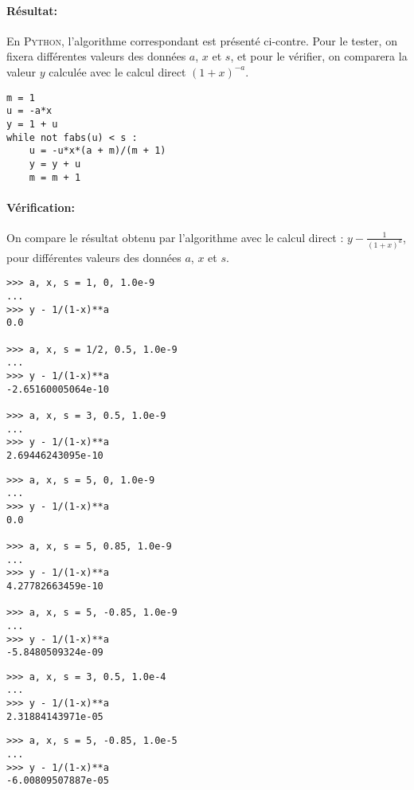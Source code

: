\documentclass[11pt,a4paper,colorlinks,breaklinks]{article}
\def\python{\textsc{Python}}
\begin{document}
\paragraph{Résultat:} En \python, l'algorithme correspondant est présenté
ci-contre.
Pour le tester, on fixera différentes valeurs des données $a$, $x$ et $s$,
et pour le vérifier, on comparera la valeur $y$ calculée 
avec le calcul direct $(1+x)^{-a}$.

\begin{minipage}[t]{8cm}
\begin{lstlisting}
m = 1
u = -a*x
y = 1 + u
while not fabs(u) < s :
    u = -u*x*(a + m)/(m + 1)
    y = y + u
    m = m + 1
\end{lstlisting}
\end{minipage}

\paragraph{Vérification:}
On compare le résultat obtenu par l'algorithme avec 
le calcul direct : $\displaystyle y - \frac{1}{(1+x)^a}$, 
pour différentes valeurs des données $a$, $x$ et $s$.
\vspace*{3mm}

\noindent
\begin{minipage}[t]{7cm}\footnotesize
\begin{Verbatim}
>>> a, x, s = 1, 0, 1.0e-9
...
>>> y - 1/(1-x)**a
0.0

>>> a, x, s = 1/2, 0.5, 1.0e-9
...
>>> y - 1/(1-x)**a
-2.65160005064e-10

>>> a, x, s = 3, 0.5, 1.0e-9
...
>>> y - 1/(1-x)**a
2.69446243095e-10
\end{Verbatim}
\end{minipage}
\hfill
\begin{minipage}[t]{7cm}\footnotesize
\begin{Verbatim}
>>> a, x, s = 5, 0, 1.0e-9
...
>>> y - 1/(1-x)**a
0.0

>>> a, x, s = 5, 0.85, 1.0e-9
...
>>> y - 1/(1-x)**a
4.27782663459e-10

>>> a, x, s = 5, -0.85, 1.0e-9
...
>>> y - 1/(1-x)**a
-5.8480509324e-09
\end{Verbatim}
\end{minipage}

\noindent
\begin{minipage}[t]{7cm}\footnotesize
\begin{Verbatim}
>>> a, x, s = 3, 0.5, 1.0e-4
...
>>> y - 1/(1-x)**a
2.31884143971e-05
\end{Verbatim}
\end{minipage}
\hfill
\begin{minipage}[t]{7cm}\footnotesize
\begin{Verbatim}
>>> a, x, s = 5, -0.85, 1.0e-5
...
>>> y - 1/(1-x)**a
-6.00809507887e-05
\end{Verbatim}
\end{minipage}
\vspace*{5mm}
\end{document}
